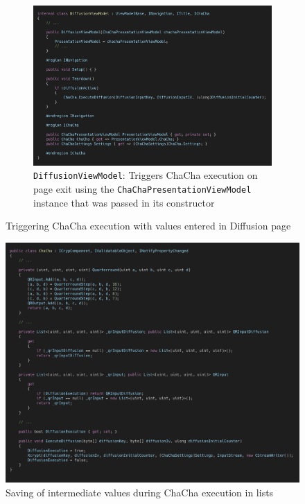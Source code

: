 \begin{figure}
\ContinuedFloat
\begin{subfigure}[t]{\textwidth}
\centering
\includegraphics[width=\textwidth]{figures/code/mvvm-arch/diffusionViewModel.png}
\caption{\texttt{DiffusionViewModel}: Triggers ChaCha execution on page exit using the \texttt{ChaChaPresentationViewModel} instance that was passed in its constructor}
 \label{fig:mvvm.viewmodelbase}
\end{subfigure}
\caption[ChaCha diffusion execution]{Triggering ChaCha execution with values entered in Diffusion page}
\label{fig:mvvm.chachatrigger}
\end{figure}

\begin{figure}
\centering
\includegraphics[width=\textwidth]{figures/code/mvvm-arch/chacha.png}
\caption[Intermediate values saving]{Saving of intermediate values during ChaCha execution in lists}
\label{fig:mvvm.chacha}
\end{figure}


